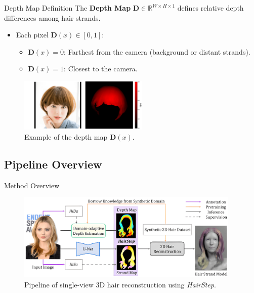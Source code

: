 \begin{frame}[t]{Depth Map Definition}
    The \textbf{Depth Map} $\mathbf{D} \in \mathbb{R}^{W \times H \times 1}$ defines relative depth differences among hair strands.

    \vspace{5pt}
    \begin{itemize}
        \item Each pixel $\mathbf{D}(x) \in [0, 1]$:
        \begin{itemize}
            \item $\mathbf{D}(x) = 0$: Farthest from the camera (background or distant strands).
            \item $\mathbf{D}(x) = 1$: Closest to the camera.
        \end{itemize}
    \end{itemize}

    \vspace{5pt}
    \begin{figure}[t]
        \centering
        \includegraphics[width=0.55\textwidth]{assets/figures/method/depth-map/depth-map.png}
        \caption{Example of the depth map $\mathbf{D}(x)$.}
        \label{fig:depth_map_example}
    \end{figure}
\end{frame}

\subsection{Pipeline Overview}

\begin{frame}[t]{Method Overview}
    \begin{figure}[t]
        \centering
        \includegraphics[width=0.95\textwidth]{assets/figures/method/overview.png}
        \caption{Pipeline of single-view 3D hair reconstruction using \emph{HairStep}.}
        \label{fig:overview}
    \end{figure}
\end{frame}

